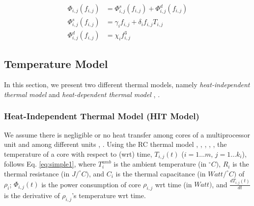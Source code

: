 \documentclass[conference]{IEEEtran}
\begin{document}
\vspace{-0.2in}

\begin{subequations}\label{eq:power}
	\begin{align}
		\Phi_{i,j}(f_{i,j}) &= \Phi^{s}_{i,j}(f_{i,j}) + \Phi^{d}_{i,j}(f_{i,j}) \label{eq:tpower} \\
		\Phi^{s}_{i,j}(f_{i,j}) &= \gamma_i f_{i,j} + \delta_i f_{i,j} T_{i,j} \label{eq:static}\\
		\Phi^{d}_{i,j}(f_{i,j}) &=  \chi_i  f_{i,j}^3 \label{eq:dynamic}
	\end{align}
\end{subequations}


\subsection{Temperature Model}

In this section, we present two different thermal models, %
namely \emph{heat-independent thermal model} \cite{Quan10} and \emph{heat-dependent thermal model} \cite{Chantem10}, \cite{Fisher09}.



\subsubsection{Heat-Independent Thermal Model (HIT Model)}

\label{sec:simple}

We assume there is negligible or no heat transfer among cores of a multiprocessor unit and among different units \cite{Quan10}, \cite{Chaturvedi10}.
Using the RC thermal model
\cite{Chen09}, \cite{Chantem10}, \cite{Quan10},  \cite{Fisher09}, \cite{Chaturvedi10}, %
the temperature of a core %
with respect to (wrt) time, %
$T_{i,j}(t)$ ($i=1\ldots m$, $j=1\ldots k_i$), %
follows
Eq. \ref{eq:simple1}, where $T_i^{amb}$ is the ambient temperature (in $^\circ C)$,
$R_i$ is the thermal resistance (in $J/ ^\circ C)$, and $C_i$ is the thermal capacitance (in $Watt/ ^\circ C)$ of $\rho_i$; $\Phi_{i,j}(t)$ is the power consumption of core $\rho_{i,j}$  wrt time (in $Watt)$,
and $\frac{dT_{i,j}(t)}{dt}$ is the derivative of $\rho_{i,j}$'s  temperature wrt time.


\vspace{-0.1in}
\end{document}
